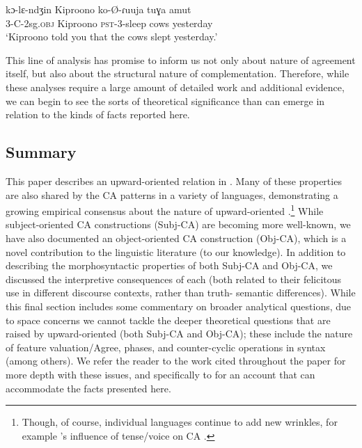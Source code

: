\documentclass[output=paper
,newtxmath
,modfonts
,nonflat]{langsci/langscibook}
\begin{document}
\ea \label{Comp-InitialSentence}
\gll kɔ-lɛ-ndʒin Kiproono ko-\O-ɾuuja tuɣa amut \\
3-C-2sg.\textsc{obj} Kiproono \textsc{pst}-3-sleep cows yesterday \\
\glt `Kiproono told you that the cows slept yesterday.'
\z

This line of analysis has promise to inform us not only about nature of agreement itself, but also about the structural nature of complementation. Therefore, while these analyses require a large amount of detailed work and additional evidence, we can begin to see the sorts of theoretical significance than can emerge in relation to the kinds of facts reported here. 

\subsection{Summary}
This paper describes an upward-oriented  relation in . Many of these properties are also shared by the CA patterns in a variety of languages, demonstrating a growing empirical consensus about the nature of upward-oriented .\footnote{Though, of course, individual languages continue to add new wrinkles, for example 's influence of tense/voice on CA \citep{LetsholoSafir:2017}.} While subject-oriented CA constructions (Subj-CA) are becoming more well-known, we have also documented an object-oriented CA construction (Obj-CA), which is a novel contribution to the linguistic literature (to our knowledge). In addition to describing the morphosyntactic properties of both Subj-CA and Obj-CA, we discussed the interpretive consequences of each (both related to their felicitous use in different discourse contexts, rather than truth- semantic differences). While this final section includes some commentary on broader analytical questions, due to space concerns we cannot tackle the deeper theoretical questions that are raised by upward-oriented  (both Subj-CA and Obj-CA); these include the nature of feature valuation/Agree, phases, and counter-cyclic operations in syntax (among others). We refer the reader to the work cited throughout the paper for more depth with these issues, and specifically to \citet{Diercks:2016anaphoric} for an account that can accommodate the facts presented here. 
\end{document}

